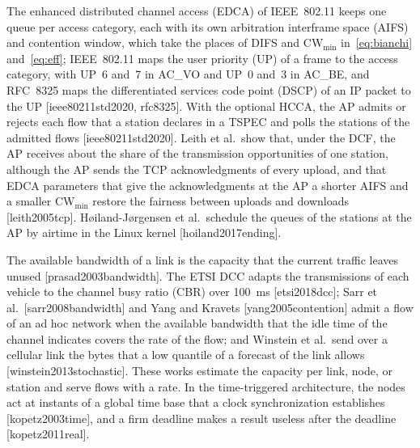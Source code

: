The enhanced distributed channel access (EDCA) of IEEE~802.11 keeps one queue per access category, each with its own arbitration interframe space (AIFS) and contention window, which take the places of DIFS and $\mathrm{CW}_{\min}$ in~\eqref{eq:bianchi} and~\eqref{eq:eff}; IEEE~802.11 maps the user priority (UP) of a frame to the access category, with UP~6 and~7 in AC\_VO and UP~0 and~3 in AC\_BE, and RFC~8325 maps the differentiated services code point (DSCP) of an IP packet to the UP [ieee80211std2020, rfc8325]. With the optional HCCA, the AP admits or rejects each flow that a station declares in a TSPEC and polls the stations of the admitted flows [ieee80211std2020]. Leith et al.\ show that, under the DCF, the AP receives about the share of the transmission opportunities of one station, although the AP sends the TCP acknowledgments of every upload, and that EDCA parameters that give the acknowledgments at the AP a shorter AIFS and a smaller $\mathrm{CW}_{\min}$ restore the fairness between uploads and downloads [leith2005tcp]. H{\o}iland-J{\o}rgensen et al.\ schedule the queues of the stations at the AP by airtime in the Linux kernel [hoiland2017ending].

The available bandwidth of a link is the capacity that the current traffic leaves unused [prasad2003bandwidth]. The ETSI DCC adapts the transmissions of each vehicle to the channel busy ratio (CBR) over 100~ms [etsi2018dcc]; Sarr et al.\ [sarr2008bandwidth] and Yang and Kravets [yang2005contention] admit a flow of an ad hoc network when the available bandwidth that the idle time of the channel indicates covers the rate of the flow; and Winstein et al.\ send over a cellular link the bytes that a low quantile of a forecast of the link allows [winstein2013stochastic]. These works estimate the capacity per link, node, or station and serve flows with a rate. In the time-triggered architecture, the nodes act at instants of a global time base that a clock synchronization establishes [kopetz2003time], and a firm deadline makes a result useless after the deadline [kopetz2011real].

